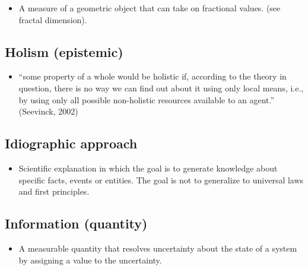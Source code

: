 \documentclass[12pt,]{book}
\providecommand{\tightlist}{%
  \setlength{\itemsep}{0pt}\setlength{\parskip}{0pt}}
\begin{document}
\begin{itemize}
\tightlist
\item
  A measure of a geometric object that can take on fractional values. (see fractal dimension).
\end{itemize}

\hypertarget{Holi35}{%
\subsection*{\texorpdfstring{\textbf{Holism (epistemic)}}{Holism (epistemic)}}\label{Holi35}}

\begin{itemize}
\tightlist
\item
  ``some property of a whole would be holistic if, according to the theory in question, there is no way we can find out about it using only local means, i.e., by using only all possible non-holistic resources available to an agent.'' (Seevinck, 2002)
\end{itemize}

\hypertarget{Idio36}{%
\subsection*{\texorpdfstring{\textbf{Idiographic approach}}{Idiographic approach}}\label{Idio36}}

\begin{itemize}
\tightlist
\item
  Scientific explanation in which the goal is to generate knowledge about specific facts, events or entities. The goal is not to generalize to universal laws and first principles.
\end{itemize}

\hypertarget{Info37}{%
\subsection*{\texorpdfstring{\textbf{Information (quantity)}}{Information (quantity)}}\label{Info37}}

\begin{itemize}
\tightlist
\item
  A measurable quantity that resolves uncertainty about the state of a system by assigning a value to the uncertainty.
\end{itemize}
\end{document}
